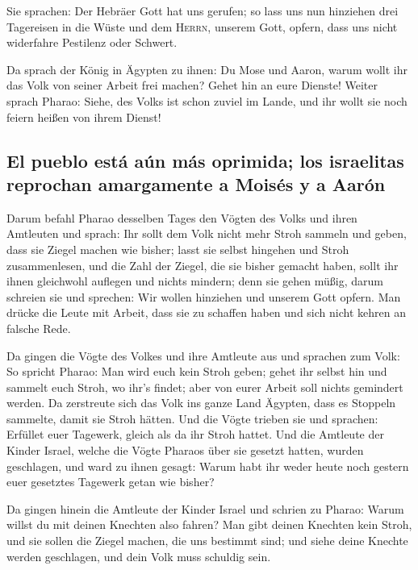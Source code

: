  Sie sprachen: Der Hebräer Gott hat uns gerufen; so lass
uns nun hinziehen drei Tagereisen in die Wüste und dem \textsc{Herrn},
unserem Gott, opfern, dass uns nicht widerfahre Pestilenz oder Schwert.

 Da sprach der König in Ägypten zu ihnen: Du Mose und
Aaron, warum wollt ihr das Volk von seiner Arbeit frei machen? Gehet hin
an eure Dienste!  Weiter sprach Pharao: Siehe, des Volks
ist schon zuviel im Lande, und ihr wollt sie noch feiern heißen von
ihrem Dienst!

\hypertarget{el-pueblo-estuxe1-auxfan-muxe1s-oprimida-los-israelitas-reprochan-amargamente-a-moisuxe9s-y-a-aaruxf3n}{%
\subsection{El pueblo está aún más oprimida; los israelitas reprochan
amargamente a Moisés y a
Aarón}\label{el-pueblo-estuxe1-auxfan-muxe1s-oprimida-los-israelitas-reprochan-amargamente-a-moisuxe9s-y-a-aaruxf3n}}

 Darum befahl Pharao desselben Tages den Vögten des Volks
und ihren Amtleuten und sprach:  Ihr sollt dem Volk nicht
mehr Stroh sammeln und geben, dass sie Ziegel machen wie bisher; lasst
sie selbst hingehen und Stroh zusammenlesen,  und die Zahl
der Ziegel, die sie bisher gemacht haben, sollt ihr ihnen gleichwohl
auflegen und nichts mindern; denn sie gehen müßig, darum schreien sie
und sprechen: Wir wollen hinziehen und unserem Gott opfern.
 Man drücke die Leute mit Arbeit, dass sie zu schaffen
haben und sich nicht kehren an falsche Rede.

 Da gingen die Vögte des Volkes und ihre Amtleute aus und
sprachen zum Volk: So spricht Pharao: Man wird euch kein Stroh geben;
 gehet ihr selbst hin und sammelt euch Stroh, wo ihr's
findet; aber von eurer Arbeit soll nichts gemindert werden.
 Da zerstreute sich das Volk ins ganze Land Ägypten, dass
es Stoppeln sammelte, damit sie Stroh hätten.  Und die
Vögte trieben sie und sprachen: Erfüllet euer Tagewerk, gleich als da
ihr Stroh hattet.  Und die Amtleute der Kinder Israel,
welche die Vögte Pharaos über sie gesetzt hatten, wurden geschlagen, und
ward zu ihnen gesagt: Warum habt ihr weder heute noch gestern euer
gesetztes Tagewerk getan wie bisher?

 Da gingen hinein die Amtleute der Kinder Israel und
schrien zu Pharao: Warum willst du mit deinen Knechten also fahren?
 Man gibt deinen Knechten kein Stroh, und sie sollen die
Ziegel machen, die uns bestimmt sind; und siehe deine Knechte werden
geschlagen, und dein Volk muss schuldig sein.

